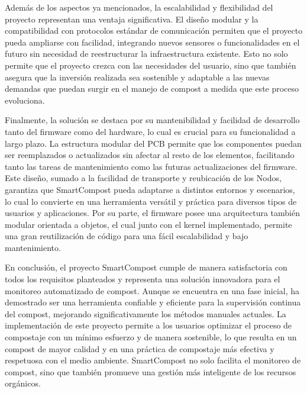 Además de los aspectos ya mencionados, la escalabilidad y flexibilidad del proyecto representan una ventaja significativa. El diseño modular y la compatibilidad con protocolos estándar de comunicación permiten que el proyecto pueda ampliarse con facilidad, integrando nuevos sensores o funcionalidades en el futuro sin necesidad de reestructurar la infraestructura existente. Esto no solo permite que el proyecto crezca con las necesidades del usuario, sino que también asegura que la inversión realizada sea sostenible y adaptable a las nuevas demandas que puedan surgir en el manejo de compost a medida que este proceso evoluciona.

Finalmente, la solución se destaca por su mantenibilidad y facilidad de desarrollo tanto del firmware como del hardware, lo cual es crucial para su funcionalidad a largo plazo. La estructura modular del PCB permite que los componentes puedan ser reemplazados o actualizados sin afectar al resto de los elementos, facilitando tanto las tareas de mantenimiento como las futuras actualizaciones del firmware. Este diseño, sumado a la facilidad de transporte y reubicación de los Nodos, garantiza que SmartCompost pueda adaptarse a distintos entornos y escenarios, lo cual lo convierte en una herramienta versátil y práctica para diversos tipos de usuarios y aplicaciones.
Por su parte, el firmware posee una arquitectura también modular orientada a objetos, el cual junto con el kernel implementado, permite una gran reutilización de código para una fácil escalabilidad y bajo mantenimiento.

En conclusión, el proyecto SmartCompost cumple de manera satisfactoria con todos los requisitos planteados y representa una solución innovadora para el monitoreo automatizado de compost. Aunque se encuentra en una fase inicial, ha demostrado ser una herramienta confiable y eficiente para la supervisión continua del compost, mejorando significativamente los métodos manuales actuales. La implementación de este proyecto permite a los usuarios optimizar el proceso de compostaje con un mínimo esfuerzo y de manera sostenible, lo que resulta en un compost de mayor calidad y en una práctica de compostaje más efectiva y respetuosa con el medio ambiente. SmartCompost no solo facilita el monitoreo de compost, sino que también promueve una gestión más inteligente de los recursos orgánicos.


